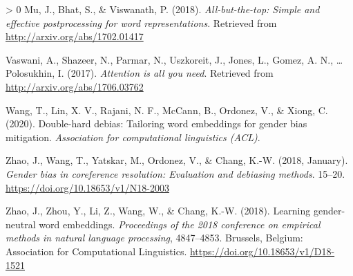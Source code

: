 \documentclass[
  english,
  man,floatsintext]{apa6}
\newlength{\cslhangindent}
\newenvironment{CSLReferences}[3] %
 {%
  \setlength{\parindent}{0pt}
  \ifodd #1 \everypar{\setlength{\hangindent}{\cslhangindent}}\ignorespaces\fi
  \ifnum #2 > 0
  \setlength{\parskip}{#3\baselineskip}
  \fi
 }%
 {}
\begin{document}
\begin{CSLReferences}{1}{0}
\leavevmode\hypertarget{ref-mu_2018}{}%
Mu, J., Bhat, S., \& Viswanath, P. (2018). \emph{All-but-the-top: Simple and effective postprocessing for word representations}. Retrieved from \url{http://arxiv.org/abs/1702.01417}

\leavevmode\hypertarget{ref-vaswani_2017}{}%
Vaswani, A., Shazeer, N., Parmar, N., Uszkoreit, J., Jones, L., Gomez, A. N., \ldots{} Polosukhin, I. (2017). \emph{Attention is all you need}. Retrieved from \url{http://arxiv.org/abs/1706.03762}

\leavevmode\hypertarget{ref-wang_2020}{}%
Wang, T., Lin, X. V., Rajani, N. F., McCann, B., Ordonez, V., \& Xiong, C. (2020). Double-hard debias: Tailoring word embeddings for gender bias mitigation. \emph{Association for computational linguistics (ACL)}.

\leavevmode\hypertarget{ref-zhao_2018a}{}%
Zhao, J., Wang, T., Yatskar, M., Ordonez, V., \& Chang, K.-W. (2018, January). \emph{Gender bias in coreference resolution: Evaluation and debiasing methods}. 15--20. \url{https://doi.org/10.18653/v1/N18-2003}

\leavevmode\hypertarget{ref-zhao_2018b}{}%
Zhao, J., Zhou, Y., Li, Z., Wang, W., \& Chang, K.-W. (2018). Learning gender-neutral word embeddings. \emph{Proceedings of the 2018 conference on empirical methods in natural language processing}, 4847--4853. Brussels, Belgium: Association for Computational Linguistics. \url{https://doi.org/10.18653/v1/D18-1521}

\end{CSLReferences}

\endgroup
\end{document}
